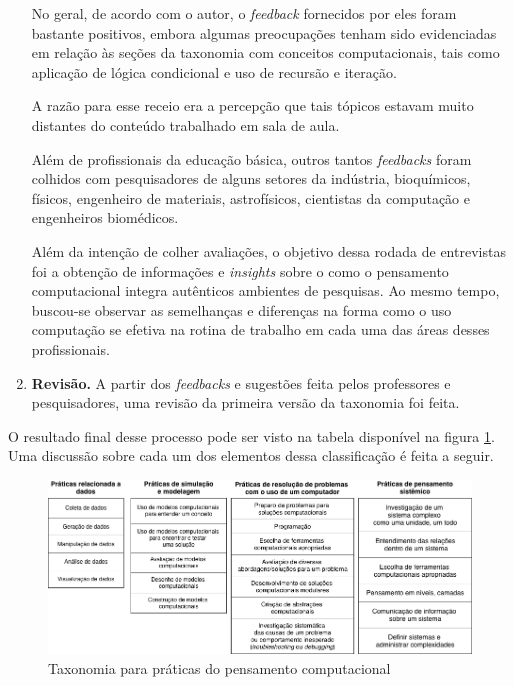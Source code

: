 \begin{enumerate}
  No geral, de acordo com o autor, o \textit{feedback} fornecidos por eles foram bastante positivos, embora algumas preocupações tenham sido evidenciadas em relação às seções da taxonomia com conceitos computacionais, tais como aplicação de lógica condicional e uso de recursão e iteração. 
  
  A razão para esse receio era a percepção que tais tópicos estavam muito distantes do conteúdo trabalhado em sala de aula.

  Além de profissionais da educação básica, outros tantos \textit{feedbacks} foram colhidos com pesquisadores de alguns setores da indústria, bioquímicos, físicos, engenheiro de materiais, astrofísicos, cientistas da computação e engenheiros biomédicos.

  Além da intenção de colher avaliações, o objetivo dessa rodada de entrevistas foi a obtenção de informações e \textit{insights} sobre o como o pensamento computacional integra autênticos ambientes de pesquisas. Ao mesmo tempo, buscou-se observar as semelhanças e diferenças na forma como o uso computação se efetiva na rotina de trabalho em cada uma das áreas desses profissionais.

  \item \textbf{Revisão.} A partir dos \textit{feedbacks} e sugestões feita pelos professores e pesquisadores, uma revisão da primeira versão da taxonomia foi feita.
\end{enumerate}


O resultado final desse processo pode ser visto na tabela disponível na figura \ref{fig:taxonomia}. Uma discussão sobre cada um dos elementos dessa classificação é feita a seguir.

\begin{landscape}
  \begin{center}
    \begin{figure}[!htb]
      \caption{Taxonomia para práticas do pensamento computacional}
      \begin{center}
          \includegraphics[scale=0.7]{imagens/taxonomia}
      \end{center}
      \label{fig:taxonomia}
    \end{figure}
  \end{center}
\end{landscape}

